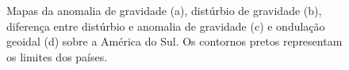 \begin{figure}[H]
	\caption{Mapas da anomalia de gravidade (a), distúrbio de gravidade (b), diferença entre distúrbio e anomalia de gravidade (c) e ondulação geoidal (d) sobre a América do Sul. Os contornos pretos representam os limites dos países.}  
	\label{subfig:anomalia}
\end{figure}